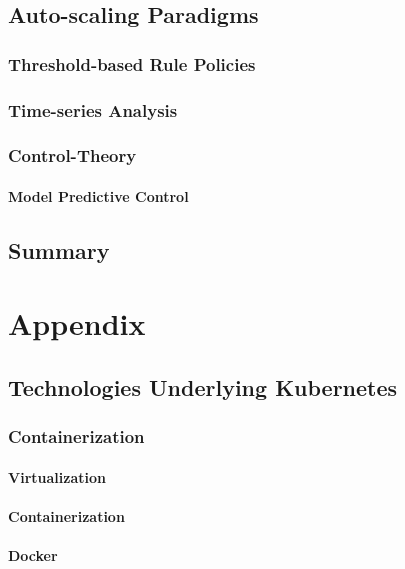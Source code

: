 \documentclass[twoside]{report}
\begin{document}
\section{Auto-scaling Paradigms}

\subsection{Threshold-based Rule Policies}

\subsection{Time-series Analysis}

\subsection{Control-Theory}

\subsubsection{Model Predictive Control}

\section{Summary}

\chapter{Appendix}

\section{Technologies Underlying Kubernetes}

\subsection{Containerization}

\subsubsection{Virtualization}

\subsubsection{Containerization}

\subsubsection{Docker}



\end{document}
